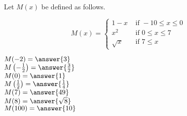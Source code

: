 \documentclass{ximera}
\author{Lee Wayand}
\begin{document}
\begin{exercise}




Let $M(x)$ be defined as follows.

\[
M(x) = 
\begin{cases}
  1 - x & \text{ if } -10 \le x \leq 0 \\
  x^2 & \text{ if } 0 \le x \leq 7 \\
  \sqrt{x} & \text{ if } 7 \le x 
\end{cases}
\]


$M(-2) = \answer{3}$ \\


$M\left( -\frac{1}{2} \right) = \answer{\frac{3}{2}}$ \\


$M(0) = \answer{1}$ \\


$M\left( \frac{1}{2} \right) = \answer{\frac{1}{4}}$ \\


$M(7) = \answer{49}$ \\


$M(8) = \answer{\sqrt{8}}$ \\


$M(100) = \answer{10}$ \\


\end{exercise}
\end{document}
